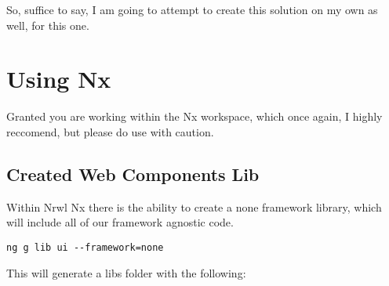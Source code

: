 So, suffice to say, I am going to attempt to create this solution on my own as well, for this one.

\section{Using Nx}
Granted you are working within the Nx workspace, which once again, I highly reccomend, but please do use with caution.

\subsection{Created Web Components Lib}
Within Nrwl Nx there is the ability to create a none framework library, which will include all of our framework agnostic code. 

\begin{lstlisting}
ng g lib ui --framework=none  
\end{lstlisting}

This will generate a libs folder with the following: 